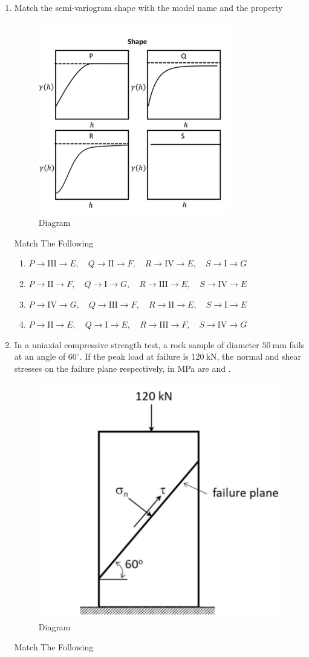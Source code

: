 \documentclass[journal,12pt,onecolumn]{IEEEtran}
\theoremstyle{remark}
\begin{document}
\begin{enumerate}
\item Match the semi-variogram shape with the model name and the property
\begin{figure}[H]
  \centering
  \includegraphics[width=0.4\columnwidth]{figs/semi.png}
  \caption{Diagram}
  \label{fig:sem}
\end{figure}
\begin{table}[H]
  \centering
  \caption{Match The Following}
  
  \label{tab:table6}
\end{table}
\hfill{}

\begin{enumerate}
\item $P\to \mathrm{III}\to E,\quad Q\to \mathrm{II}\to F,\quad R\to \mathrm{IV}\to E,\quad S\to \mathrm{I}\to G$
\item $P\to \mathrm{II}\to F,\quad Q\to \mathrm{I}\to G,\quad R\to \mathrm{III}\to E,\quad S\to \mathrm{IV}\to E$
\item $P\to \mathrm{IV}\to G,\quad Q\to \mathrm{III}\to F,\quad R\to \mathrm{II}\to E,\quad S\to \mathrm{I}\to E$
\item $P\to \mathrm{II}\to E,\quad Q\to \mathrm{I}\to E,\quad R\to \mathrm{III}\to F,\quad S\to \mathrm{IV}\to G$
\end{enumerate}

\item In a uniaxial compressive strength test, a rock sample of diameter $50 \ \text{mm}$ fails at an angle of $60^\circ$. If the peak load at failure is $120 \ \text{kN}$, the normal and shear stresses 
on the failure plane respectively, in MPa are \underline{\hspace{1.5cm}} and \underline{\hspace{1.5cm}}.
\begin{figure}[H]
  \centering
  \includegraphics[width=0.4\columnwidth]{figs/stress.png}
  \caption{Diagram}
  \label{fig:ste}
\end{figure}
\begin{table}[H]
  \centering
  \caption{Match The Following}
  
  \label{tab:table7}
\end{table}


\end{enumerate}
\end{document}
